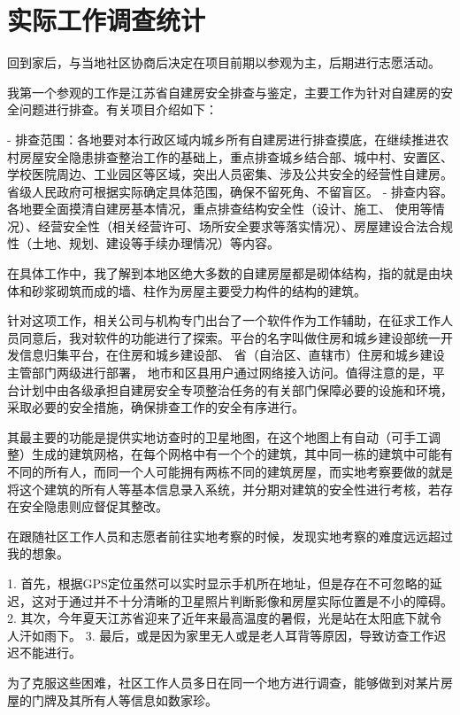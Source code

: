 \documentclass[AutoFakeBold]{LZUThesis}
\begin{document}
\newpage

\section{实际工作调查统计}

回到家后，与当地社区协商后决定在项目前期以参观为主，后期进行志愿活动。

我第一个参观的工作是江苏省自建房安全排查与鉴定，主要工作为针对自建房的安全问题进行排查。有关项目介绍如下：

- 排查范围：各地要对本行政区域内城乡所有自建房进行排查摸底，在继续推进农村房屋安全隐患排查整治工作的基础上，重点排查城乡结合部、城中村、安置区、学校医院周边、工业园区等区域，突出人员密集、涉及公共安全的经营性自建房。省级人民政府可根据实际确定具体范围，确保不留死角、不留盲区。
- 排查内容。各地要全面摸清自建房基本情况，重点排查结构安全性（设计、施工、 使用等情况）、经营安全性（相关经营许可、场所安全要求等落实情况）、房屋建设合法合规性（土地、规划、建设等手续办理情况）等内容。

在具体工作中，我了解到本地区绝大多数的自建房屋都是砌体结构，指的就是由块体和砂浆砌筑而成的墙、柱作为房屋主要受力构件的结构的建筑。

针对这项工作，相关公司与机构专门出台了一个软件作为工作辅助，在征求工作人员同意后，我对软件的功能进行了探索。平台的名字叫做住房和城乡建设部统一开发信息归集平台，在住房和城乡建设部、 省（自治区、直辖市）住房和城乡建设主管部门两级进行部署， 地市和区县用户通过网络接入访问。值得注意的是，平台计划中由各级承担自建房安全专项整治任务的有关部门保障必要的设施和环境，采取必要的安全措施，确保排查工作的安全有序进行。

其最主要的功能是提供实地访查时的卫星地图，在这个地图上有自动（可手工调整）生成的建筑网格，在每个网格中有一个个的建筑，其中同一栋的建筑中可能有不同的所有人，而同一个人可能拥有两栋不同的建筑房屋，而实地考察要做的就是将这个建筑的所有人等基本信息录入系统，并分期对建筑的安全性进行考核，若存在安全隐患则应督促其整改。

在跟随社区工作人员和志愿者前往实地考察的时候，发现实地考察的难度远远超过我的想象。

1. 首先，根据GPS定位虽然可以实时显示手机所在地址，但是存在不可忽略的延迟，这对于通过并不十分清晰的卫星照片判断影像和房屋实际位置是不小的障碍。
2. 其次，今年夏天江苏省迎来了近年来最高温度的暑假，光是站在太阳底下就令人汗如雨下。
3. 最后，或是因为家里无人或是老人耳背等原因，导致访查工作迟迟不能进行。

为了克服这些困难，社区工作人员多日在同一个地方进行调查，能够做到对某片房屋的门牌及其所有人等信息如数家珍。
\end{document}
